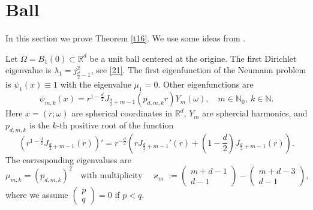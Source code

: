 \documentclass[a4paper,12pt]{article}
\numberwithin{equation}{section}
\def \ka{\varkappa}
\def \la{\lambda}
\def \oo{\omega}
\def \O{\Omega}
\def \N{\mathbb{N}}
\def \R{\mathbb{R}}
\newcommand{\<}{\langle}
\renewcommand{\>}{\rangle}
\theoremstyle{plain}
\theoremstyle{definition}
\theoremstyle{remark}
\begin{document}
\section{Ball}
In this section we prove Theorem \ref{t16}.
We use some ideas from \cite{CMS}.

Let $\O = B_1 (0) \subset \R^d$ be a unit ball centered at the origine.
The first Dirichlet eigenvalue is 
$\la_1 = j_{\frac{d}2-1}^2$, see \eqref{21}.
The first eigenfunction of the Neumann problem is $\psi_1 (x) \equiv 1$
with the eigenvalue $\mu_1 = 0$.
Other eigenfunctions are
$$
\psi_{m,k} (x) = r^{1-\frac{d}2} J_{\frac{d}2 + m -1} \left(p_{d,m,k} r\right) Y_m (\oo),
\quad m \in \N_0, \ k \in \N.
$$
Here $x = (r; \oo)$ are spherical coordinates in $\R^d$,
$Y_m$ are sphercial harmonics,
and $p_{d,m,k}$ is the $k$-th positive root of the function
\begin{equation}
\label{41}
\left(r^{1-\frac{d}2} J_{\frac{d}2 + m -1} (r)\right)'
= r^{-\frac{d}2} \left(r J_{\frac{d}2 + m -1}' (r) 
+ \left(1-\frac{d}2\right) J_{\frac{d}2 + m -1} (r)\right).
\end{equation}
The corresponding eigenvalues are 
$$
\mu_{m,k} = \left(p_{d,m,k}\right)^2
\quad \text{with multiplicity} \quad 
\ka_m := \left( \begin{array}{cc} m + d - 1 \\ d-1 \end{array} \right) 
- \left( \begin{array}{cc} m + d - 3 \\ d-1 \end{array} \right) ,
$$
where we assume $\left( \begin{array}{cc} p \\ q \end{array} \right) = 0$
if $p < q$.
\end{document}
